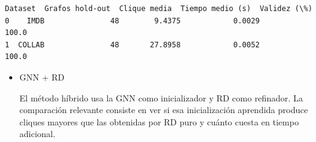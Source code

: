 \documentclass[11pt]{article}
\begin{document}
    
    \begin{Verbatim}[commandchars=\\\{\}]
  Dataset  Grafos hold-out  Clique media  Tiempo medio (s)  Validez (\%)
0    IMDB               48        9.4375            0.0029        100.0
1  COLLAB               48       27.8958            0.0052        100.0
    \end{Verbatim}

    
    \begin{itemize}
\item
  GNN + RD

  El método híbrido usa la GNN como inicializador y RD como refinador.
  La comparación relevante consiste en ver si esa inicialización
  aprendida produce cliques mayores que las obtenidas por RD puro y
  cuánto cuesta en tiempo adicional.
\end{itemize}
\end{document}
